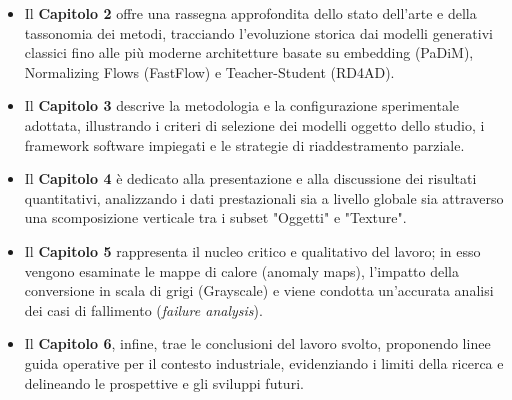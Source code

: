 \begin{itemize}
    \item Il \textbf{Capitolo 2} offre una rassegna approfondita dello stato dell'arte e della tassonomia dei metodi, tracciando l'evoluzione storica dai modelli generativi classici fino alle più moderne architetture basate su embedding (PaDiM), Normalizing Flows (FastFlow) e Teacher-Student (RD4AD).
    \item Il \textbf{Capitolo 3} descrive la metodologia e la configurazione sperimentale adottata, illustrando i criteri di selezione dei modelli oggetto dello studio, i framework software impiegati e le strategie di riaddestramento parziale.
    \item Il \textbf{Capitolo 4} è dedicato alla presentazione e alla discussione dei risultati quantitativi, analizzando i dati prestazionali sia a livello globale sia attraverso una scomposizione verticale tra i subset "Oggetti" e "Texture".
    \item Il \textbf{Capitolo 5} rappresenta il nucleo critico e qualitativo del lavoro; in esso vengono esaminate le mappe di calore (anomaly maps), l'impatto della conversione in scala di grigi (Grayscale) e viene condotta un'accurata analisi dei casi di fallimento (\textit{failure analysis}).
    \item Il \textbf{Capitolo 6}, infine, trae le conclusioni del lavoro svolto, proponendo linee guida operative per il contesto industriale, evidenziando i limiti della ricerca e delineando le prospettive e gli sviluppi futuri.
\end{itemize}


